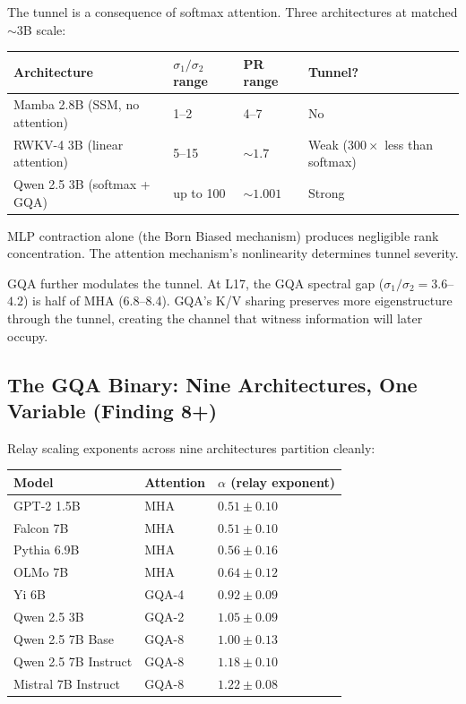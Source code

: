 \documentclass[12pt]{article}
\begin{document}
The tunnel is a consequence of softmax attention. Three architectures at matched ${\sim}3$B scale:

\begin{table}[h]
\centering
\begin{tabular}{lllll}
\toprule
\textbf{Architecture} & $\sigma_1/\sigma_2$ \textbf{range} & \textbf{PR range} & \textbf{Tunnel?} \\
\midrule
Mamba 2.8B (SSM, no attention) & 1--2 & 4--7 & No \\
RWKV-4 3B (linear attention) & 5--15 & ${\sim}1.7$ & Weak ($300\times$ less than softmax) \\
Qwen 2.5 3B (softmax + GQA) & up to 100 & ${\sim}1.001$ & Strong \\
\bottomrule
\end{tabular}
\end{table}

MLP contraction alone (the Born Biased mechanism) produces negligible rank concentration. The attention mechanism's nonlinearity determines tunnel severity.

GQA further modulates the tunnel. At L17, the GQA spectral gap ($\sigma_1/\sigma_2 = 3.6$--$4.2$) is half of MHA (6.8--8.4). GQA's K/V sharing preserves more eigenstructure through the tunnel, creating the channel that witness information will later occupy.

\subsection{The GQA Binary: Nine Architectures, One Variable (Finding 8+)}

Relay scaling exponents across nine architectures partition cleanly:

\begin{table}[h]
\centering
\begin{tabular}{lll}
\toprule
\textbf{Model} & \textbf{Attention} & $\alpha$ \textbf{(relay exponent)} \\
\midrule
GPT-2 1.5B & MHA & $0.51 \pm 0.10$ \\
Falcon 7B & MHA & $0.51 \pm 0.10$ \\
Pythia 6.9B & MHA & $0.56 \pm 0.16$ \\
OLMo 7B & MHA & $0.64 \pm 0.12$ \\
Yi 6B & GQA-4 & $0.92 \pm 0.09$ \\
Qwen 2.5 3B & GQA-2 & $1.05 \pm 0.09$ \\
Qwen 2.5 7B Base & GQA-8 & $1.00 \pm 0.13$ \\
Qwen 2.5 7B Instruct & GQA-8 & $1.18 \pm 0.10$ \\
Mistral 7B Instruct & GQA-8 & $1.22 \pm 0.08$ \\
\bottomrule
\end{tabular}
\end{table}
\end{document}

